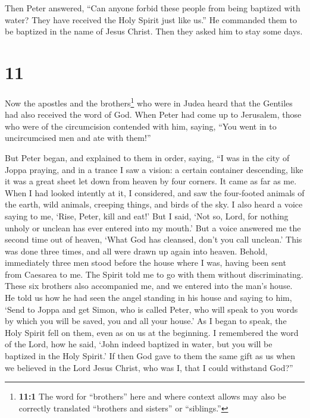 Then Peter answered,  ``Can anyone forbid these people
from being baptized with water? They have received the Holy Spirit just
like us.''  He commanded them to be baptized in the name
of Jesus Christ. Then they asked him to stay some days.

\hypertarget{section-10}{%
\section{11}\label{section-10}}

 Now the apostles and the brothers\footnote{\textbf{11:1}
  The word for ``brothers'' here and where context allows may also be
  correctly translated ``brothers and sisters'' or ``siblings.''} who
were in Judea heard that the Gentiles had also received the word of God.
 When Peter had come up to Jerusalem, those who were of
the circumcision contended with him,  saying, ``You went
in to uncircumcised men and ate with them!''

 But Peter began, and explained to them in order, saying,
 ``I was in the city of Joppa praying, and in a trance I
saw a vision: a certain container descending, like it was a great sheet
let down from heaven by four corners. It came as far as me.
 When I had looked intently at it, I considered, and saw
the four-footed animals of the earth, wild animals, creeping things, and
birds of the sky.  I also heard a voice saying to me,
`Rise, Peter, kill and eat!'  But I said, `Not so, Lord,
for nothing unholy or unclean has ever entered into my mouth.'
 But a voice answered me the second time out of heaven,
`What God has cleansed, don't you call unclean.'  This
was done three times, and all were drawn up again into heaven.
 Behold, immediately three men stood before the house
where I was, having been sent from Caesarea to me.  The
Spirit told me to go with them without discriminating. These six
brothers also accompanied me, and we entered into the man's house.
 He told us how he had seen the angel standing in his
house and saying to him, `Send to Joppa and get Simon, who is called
Peter,  who will speak to you words by which you will be
saved, you and all your house.'  As I began to speak, the
Holy Spirit fell on them, even as on us at the beginning.
 I remembered the word of the Lord, how he said, `John
indeed baptized in water, but you will be baptized in the Holy Spirit.'
 If then God gave to them the same gift as us when we
believed in the Lord Jesus Christ, who was I, that I could withstand
God?''

